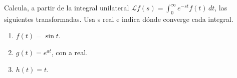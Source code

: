 Calcula, a partir de la integral unilateral \(\mathcal Lf(s)=\int_0^\infty e^{-st}f(t)\,dt\), las siguientes transformadas. Usa s real e indica dónde converge cada integral.

\begin{enumerate}[label=(\alph*),ref=\alph*,leftmargin=*]
\item \(f(t)=\sin t\).
\item \(g(t)=e^{at}\), con a real.
\item \(h(t)=t\).
\end{enumerate}
